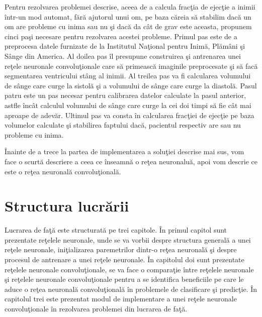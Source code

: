 Pentru rezolvarea problemei descrise, aceea de a calcula frac\c{t}ia de ejec\c{t}ie a inimii \^{i}ntr-un mod automat, f\u{a}r\u{a} ajutorul unui om, pe baza c\u{a}reia s\u{a} stabilim dac\u{a} un om are probleme cu inima sau nu \c{s}i dac\u{a} da c\^{a}t de grav este aceasta, propunem cinci pa\c{s}i necesare pentru rezolvarea acestei probleme. Primul pas este de a preprocesa datele furnizate de la Institutul Na\c{t}ional pentru Inim\u{a}, Pl\u{a}m\^{a}ni \c{s}i S\^{a}nge din America. Al doilea pas \^{i}l presupune construirea \c{s}i antrenarea unei re\c{t}ele neuronale convolu\c{t}ionale care s\u{a} primeasc\u{a} imaginile preprocesate \c{s}i s\u{a} fac\u{a} segmentarea ventricului st\^{a}ng al inimii. Al treilea pas va fi calcularea volumului de s\^{a}nge care curge la sistol\u{a} \c{s}i a volumului de s\^{a}nge care curge la diastol\u{a}. Pasul patru este un pas necesar pentru calibrarea datelor calculate la pasul anterior, astfle \^{i}nc\^{a}t calculul volumului de s\^{a}nge care curge la cei doi timpi s\u{a} fie c\^{a}t mai aproape de adev\u{a}r. Ultimul pas va consta \^{i}n calcularea frac\c{t}iei de ejec\c{t}ie pe baza volumelor calculate \c{s}i stabilirea faptului dac\u{a}, pacientul respectiv are sau nu probleme cu inima. 

\par

\^{I}nainte de a trece la partea de implementarea a solu\c{t}iei descrise mai sus, vom face o scurt\u{a} descriere a ceea ce \^{i}nseamn\u{a} o re\c{t}ea neuronalu\u{a}, apoi vom descrie ce este o re\c{t}ea neuronal\u{a} convolu\c{t}ional\u{a}.

\section{Structura lucr\u{a}rii}

Lucrarea de fa\c{t}\u{a} este structurat\u{a} pe trei capitole. \^{I}n primul capitol sunt prezentate re\c{t}elele neuronale, unde se va vorbii despre structura general\u{a} a unei re\c{t}ele neuronale, ini\c{t}ializarea paremetrilor dintr-o re\c{t}ea neuronal\u{a} \c{s}i despre procesul de antrenare a unei re\c{t}ele neuronale. \^{I}n capitolul doi sunt prezentate re\c{t}elele neuronale convolu\c{t}ionale, se va face o compara\c{t}ie \^{i}ntre re\c{t}elele neuronale \c{s}i re\c{t}elele neuronale convolu\c{t}ionale pentru a se identifica beneficiile pe care le aduce o re\c{t}ea neuronal\u{a} convolu\c{t}ional\u{a} \^{i}n problemele de clasificare \c{s}i predic\c{t}ie. \^{I}n capitolul trei este prezentat modul de implementare a unei re\c{t}ele neuronale convolu\c{t}ionale \^{i}n rezolvarea problemei din lucrarea de fa\c{t}\u{a}.